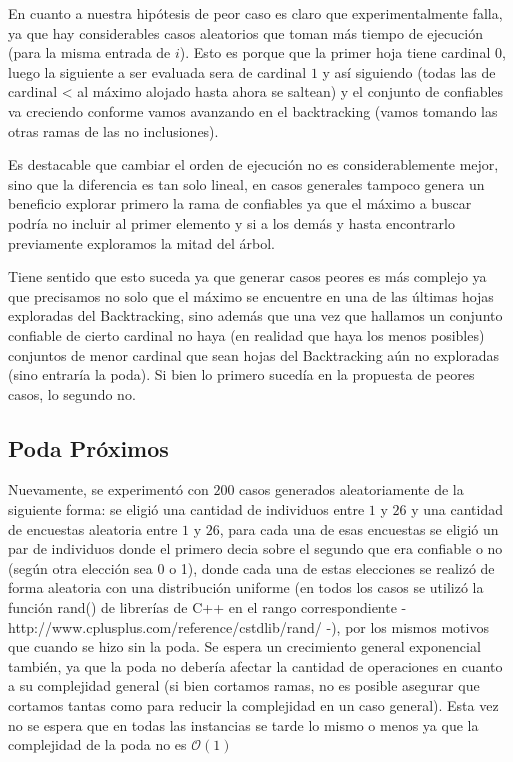 \documentclass[A4paper,oneside,fleqn,10pt]{article}
\theoremstyle{definition}
\begin{document}
En cuanto a nuestra hipótesis de peor caso es claro que experimentalmente falla, ya que hay considerables casos aleatorios que toman más tiempo de ejecución (para la misma entrada de $i$). Esto es porque que la primer hoja tiene cardinal $0$, luego la siguiente a ser evaluada sera de cardinal $1$ y así siguiendo (todas las de cardinal < al máximo alojado hasta ahora se saltean) y el conjunto de confiables va creciendo conforme vamos avanzando en el backtracking (vamos tomando las otras ramas de las no inclusiones). 

Es destacable que cambiar el orden de ejecución no es considerablemente mejor, sino que la diferencia es tan solo lineal, en casos generales tampoco genera un beneficio explorar primero la rama de confiables ya que el máximo a buscar podría no incluir al primer elemento y si a los demás y hasta encontrarlo previamente exploramos la mitad del árbol. 

Tiene sentido que esto suceda ya que generar casos peores es más complejo ya que precisamos no solo que el máximo se encuentre en una de las últimas hojas exploradas del Backtracking, sino además que una vez que hallamos un conjunto confiable de cierto cardinal no haya (en realidad que haya los menos posibles) conjuntos de menor cardinal que sean hojas del Backtracking aún no exploradas (sino entraría la poda). Si bien lo primero sucedía en la propuesta de peores casos, lo segundo no.

\subsection{Poda Próximos}
Nuevamente, se experimentó con $200$ casos generados aleatoriamente de la siguiente forma: se eligió una cantidad de individuos entre $1$ y $26$ y una cantidad de encuestas aleatoria entre $1$ y $26$, para cada una de esas encuestas se eligió un par de individuos donde el primero decia sobre el segundo que era confiable o no (según otra elección sea 0 o 1), donde cada una de estas elecciones se realizó de forma aleatoria con una distribución uniforme (en todos los casos se utilizó la función rand()  de librerías de C++ en el rango correspondiente - http://www.cplusplus.com/reference/cstdlib/rand/ -), por los mismos motivos que cuando se hizo sin la poda. Se espera un crecimiento general exponencial también, ya que la poda no debería afectar la cantidad de operaciones en cuanto a su complejidad general (si bien cortamos ramas, no es posible asegurar que cortamos tantas como para reducir la complejidad en un caso general). Esta vez no se espera que en todas las instancias se tarde lo mismo o menos ya que la complejidad de la poda no es $\mathcal{O}(1)$
\end{document}
